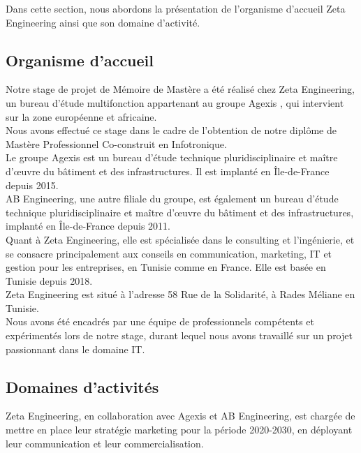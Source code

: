 Dans cette section, nous abordons la présentation de l'organisme d'accueil Zeta Engineering ainsi que son domaine d'activité.

\subsection{Organisme d'accueil}


Notre stage de projet de Mémoire de Mastère a été réalisé chez Zeta Engineering, un bureau d'étude multifonction appartenant au groupe Agexis \cite{agexis}, qui intervient sur la zone européenne et africaine. \\

Nous avons effectué ce stage dans le cadre de l'obtention de notre diplôme de Mastère Professionnel Co-construit en Infotronique. \\

Le groupe Agexis est un bureau d'étude technique pluridisciplinaire et maître d'œuvre du bâtiment et des infrastructures. Il est implanté en Île-de-France depuis 2015.  \\


AB Engineering, une autre filiale du groupe, est également un bureau d'étude technique pluridisciplinaire et maître d'œuvre du bâtiment et des infrastructures, implanté en Île-de-France depuis 2011. \\


Quant à Zeta Engineering, elle est spécialisée dans le consulting et l'ingénierie, et se consacre principalement aux conseils en communication, marketing, IT et gestion pour les entreprises, en Tunisie comme en France. Elle est basée en Tunisie depuis 2018. \\


Zeta Engineering est situé à l'adresse 58 Rue de la Solidarité, à Rades Méliane en Tunisie. \\


Nous avons été encadrés par une équipe de professionnels compétents et expérimentés lors de notre stage, durant lequel nous avons travaillé sur un projet passionnant dans le domaine IT. \\





\subsection{Domaines d'activités}
Zeta Engineering, en collaboration avec Agexis et AB Engineering, est chargée de mettre en place leur stratégie marketing pour la période 2020-2030, en déployant leur communication et leur commercialisation. \\


